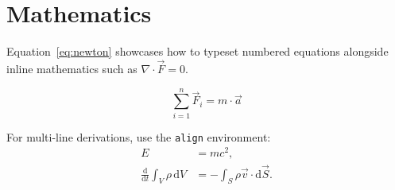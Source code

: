 \section{Mathematics}

Equation~\eqref{eq:newton} showcases how to typeset numbered equations alongside inline mathematics such as \( \nabla \cdot \vec{F} = 0 \).

\begin{equation}
  \label{eq:newton}
  \sum_{i=1}^{n} \vec{F}_i = m \cdot \vec{a}
\end{equation}

For multi-line derivations, use the \texttt{align} environment:
\begin{align}
  E &= mc^2, \\
  \frac{\mathrm{d}}{\mathrm{d}t} \int_{V} \rho \, \mathrm{d}V &= - \int_{S} \rho \vec{v} \cdot \mathrm{d}\vec{S}.
\end{align}
